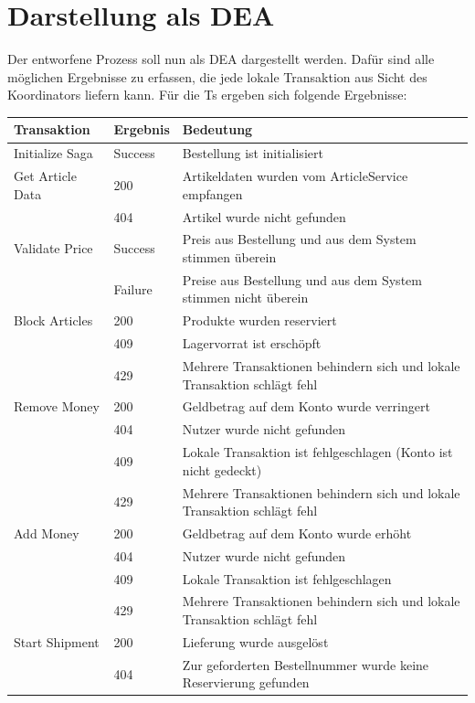 \section{Darstellung als DEA}
Der entworfene Prozess soll nun als DEA dargestellt werden. Dafür sind alle möglichen Ergebnisse zu erfassen, die jede lokale Transaktion aus Sicht des Koordinators liefern kann. 
Für die Ts ergeben sich folgende Ergebnisse:

\begin{center}
	\begin{tabular}[h]{|p{3cm}|p{1.5cm}|p{11cm}|}
		\hline
		Transaktion	& Ergebnis & Bedeutung \\ \hline
		Initialize Saga 	& Success 	& Bestellung ist initialisiert \\ \hline
		Get Article Data	& 200 		& Artikeldaten wurden vom ArticleService empfangen \\
							& 404 		& Artikel wurde nicht gefunden \\ \hline
		Validate Price 		& Success 	& Preis aus Bestellung und aus dem System stimmen überein \\
							& Failure 	& Preise aus Bestellung und aus dem System stimmen nicht überein \\ \hline
		Block Articles		& 200		& Produkte wurden reserviert \\
							& 409 		& Lagervorrat ist erschöpft \\
							& 429 		& Mehrere Transaktionen behindern sich und lokale Transaktion schlägt fehl \\ \hline
		Remove Money 		& 200		& Geldbetrag auf dem Konto wurde verringert \\
							& 404		& Nutzer wurde nicht gefunden \\
							& 409		& Lokale Transaktion ist fehlgeschlagen (Konto ist nicht gedeckt) \\
							& 429		& Mehrere Transaktionen behindern sich und lokale Transaktion schlägt fehl \\ \hline
		Add Money 			& 200		& Geldbetrag auf dem Konto wurde erhöht \\
							& 404		& Nutzer wurde nicht gefunden \\
							& 409		& Lokale Transaktion ist fehlgeschlagen \\
							& 429		& Mehrere Transaktionen behindern sich und lokale Transaktion schlägt fehl \\ \hline
		Start Shipment 		& 200		& Lieferung wurde ausgelöst \\
							& 404		& Zur geforderten Bestellnummer wurde keine Reservierung gefunden \\

\end{tabular}
\end{center}

